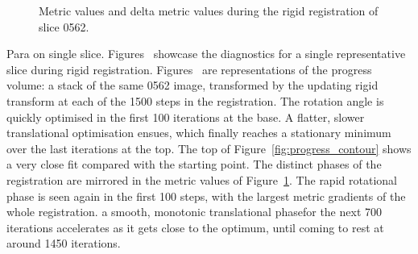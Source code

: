   \begin{figure}[p]
    \centering
    \caption{Metric values and delta metric values during the rigid registration of slice 0562.}
    \label{fig:0562_correlation}
  \end{figure}
	
	Para on single slice.
	Figures~ showcase the diagnostics for a single representative slice during rigid registration. Figures~ are representations of the progress volume: a stack of the same 0562 image, transformed by the updating rigid transform at each of the 1500 steps in the registration. The rotation angle is quickly optimised in the first 100 iterations at the base. A flatter, slower translational optimisation ensues, which finally reaches a stationary minimum over the last iterations at the top. The top of Figure~\ref{fig:progress_contour} shows a very close fit compared with the starting point. The distinct phases of the registration are mirrored in the metric values of Figure~\ref{fig:0562_correlation}. The rapid rotational phase is seen again in the first 100 steps, with the largest metric gradients of the whole registration. a smooth, monotonic translational phasefor the next 700 iterations accelerates as it gets close to the optimum, until coming to rest at around 1450 iterations.
	
